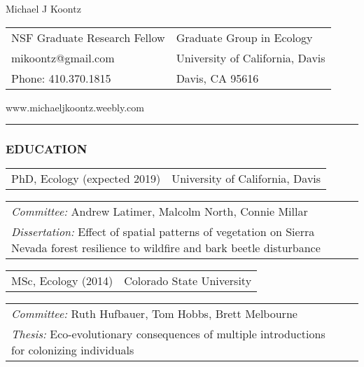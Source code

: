 \documentclass[11pt,english]{article}
\providecommand{\tabularnewline}{\\}
\begin{document}
\begin {center}
{\huge Michael J Koontz}\tabularnewline
\vspace{1em}

\begin{tabular}{>{\raggedright}p{3in}>{\raggedleft}p{3in}}
NSF Graduate Research Fellow & Graduate Group in Ecology\tabularnewline
mikoontz@gmail.com & University of California, Davis\tabularnewline
Phone: 410.370.1815 & Davis, CA 95616\tabularnewline
\end{tabular}
www.michaeljkoontz.weebly.com
\end{center}
\vspace{-1.5em}

\rule[0.5ex]{1\columnwidth}{0.5pt}


\vspace{0.5ex}
\subsubsection*{EDUCATION}
\vspace{-0.5ex}

\begin{tabular}{>{\raggedright}p{4in}>{\raggedleft}p{2in}}
PhD, Ecology (expected 2019) & University of California, Davis\tabularnewline
\end{tabular}

\hspace{1.0em}
\begin{tabular}{p{6in}p{0in}}
\emph{Committee:} Andrew Latimer, Malcolm North, Connie Millar & \tabularnewline
\emph{Dissertation:} Effect of spatial patterns of vegetation on Sierra Nevada forest resilience to wildfire and bark beetle disturbance &
\end{tabular}

\vspace{0.5ex}

\begin{tabular}{>{\raggedright}p{4in}>{\raggedleft}p{2in}}
MSc, Ecology (2014) & Colorado State University\tabularnewline
\end{tabular}

\hspace{1.0em}
\begin{tabular}{p{6in}p{0in}}
\emph{Committee:} Ruth Hufbauer, Tom Hobbs, Brett Melbourne & \tabularnewline
\emph{Thesis:} Eco-evolutionary consequences of multiple introductions for colonizing individuals &
\end{tabular}
\end{document}
